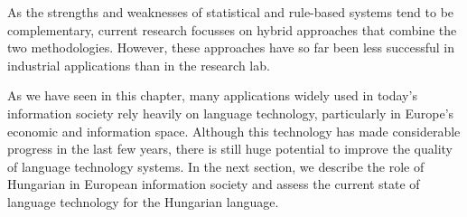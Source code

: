 \begin{multicols}{2}
As the strengths and weaknesses of statistical and rule-based systems tend to be complementary, current research focusses on hybrid approaches that combine the two methodologies. However, these approaches have so far been less successful in industrial applications than in the research lab. 

As we have seen in this chapter, many applications widely used in today’s information society rely heavily on language technology, particularly in Europe’s economic and information space. Although this technology has made considerable progress in the last few years, there is still huge potential to improve the quality of language technology systems. In the next section, we describe the role of Hungarian in European information society and assess the current state of language technology for the Hungarian language.
\end{multicols}

\clearpage



